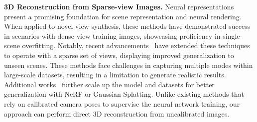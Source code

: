 \noindent\textbf{3D Reconstruction from Sparse-view Images.}  Neural representations~\citep{occupancy,deepsdf,nerf,sitzmann2019scene,tewari2022advances} present a promising foundation for scene representation and neural rendering.
When applied to novel-view synthesis, these methods have demonstrated success in scenarios with dense-view training images, showcasing proficiency in single-scene overfitting.
Notably, recent advancements~\citep{pixelnerf, mvsnerf, sparseneus, ibrnet, visionnerf, dietnerf, chen2024mvsplat, zhang2024worldconsistentvideodiffusionexplicit} have extended these techniques to operate with a sparse set of views, displaying improved generalization to unseen scenes.
These methods face challenges in capturing multiple modes within large-scale datasets, resulting in a limitation to generate realistic results.
Additional works~\citep{xu2024grm, li2023instant3d, hong2023lrm, charatan2024pixelsplat} further scale up the model and datasets for better generalization with NeRF or Gaussian Splatting.
%
Unlike existing methods that rely on calibrated camera poses to supervise the neural network training, our approach can perform direct 3D reconstruction from uncalibrated images.

